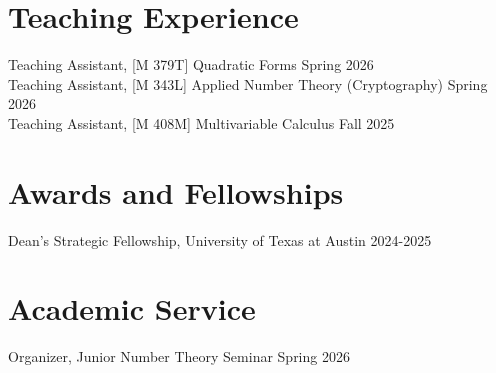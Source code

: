 \documentclass[10pt,letterpaper]{article}
\begin{document}
\section*{Teaching Experience}

Teaching Assistant, [M 379T] Quadratic Forms \hfill Spring 2026\\
Teaching Assistant, [M 343L] Applied Number Theory (Cryptography) \hfill Spring 2026\\
Teaching Assistant, [M 408M] Multivariable Calculus \hfill Fall 2025

\section*{Awards and Fellowships}

Dean's Strategic Fellowship, University of Texas at Austin \hfill 2024-2025


\section*{Academic Service}

Organizer, Junior Number Theory Seminar \hfill Spring 2026
\end{document}
